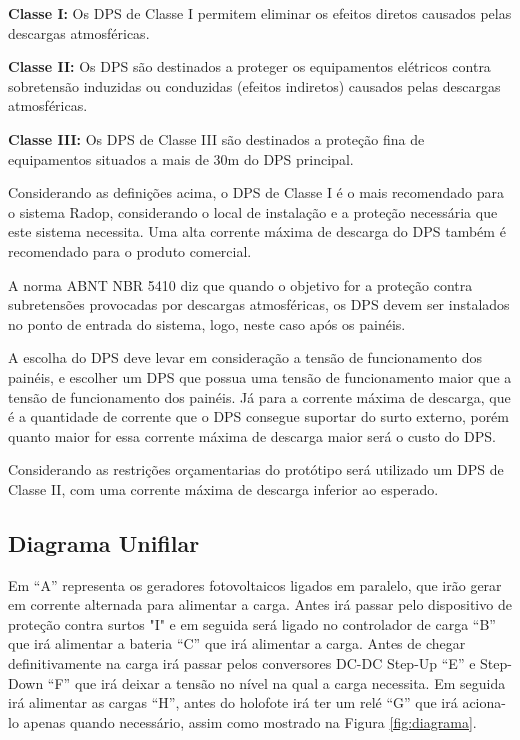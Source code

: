  \textbf{Classe I:} Os DPS  de Classe I permitem eliminar os efeitos diretos causados pelas descargas atmosféricas. 
 
\textbf{Classe II:} Os DPS são destinados a proteger os equipamentos elétricos contra sobretensão induzidas ou conduzidas (efeitos indiretos) causados pelas descargas atmosféricas. 

 \textbf{Classe III:} Os DPS de Classe III são destinados a proteção fina de equipamentos situados a mais de 30m do DPS principal. 

Considerando as definições acima, o DPS de Classe I é o mais recomendado para o sistema Radop, considerando o local de instalação e a proteção necessária que este sistema necessita. Uma alta corrente máxima de descarga do DPS também é recomendado para o produto comercial. 

A norma ABNT NBR 5410 \cite{protecao} diz que quando o objetivo for a proteção contra subretensões provocadas por descargas atmosféricas, os DPS devem ser instalados no ponto de entrada do sistema, logo, neste caso após os painéis.

A escolha do DPS deve levar em consideração a tensão de funcionamento dos painéis, e escolher um DPS que possua uma tensão de funcionamento maior que a tensão de funcionamento dos painéis. Já para a corrente máxima de  descarga, que é a quantidade de corrente que o DPS consegue suportar do surto externo, porém quanto maior for essa corrente máxima de descarga maior será o custo do DPS.

Considerando as restrições orçamentarias do protótipo será utilizado um DPS de Classe II, com uma corrente máxima de descarga inferior ao esperado.

\subsection{Diagrama Unifilar}

Em “A” representa os geradores fotovoltaicos ligados em paralelo, que irão gerar em corrente alternada para alimentar a carga. Antes irá passar pelo dispositivo de proteção contra surtos "I" e em seguida será ligado no controlador de carga “B” que irá alimentar a bateria “C” que irá alimentar a carga. Antes de chegar definitivamente na carga irá passar pelos conversores DC-DC Step-Up “E” e Step-Down “F” que irá deixar a tensão no nível na qual a carga necessita. Em seguida irá alimentar as cargas “H”, antes do holofote irá ter um relé “G” que irá aciona-lo apenas quando necessário, assim como mostrado na Figura \ref{fig:diagrama}.

